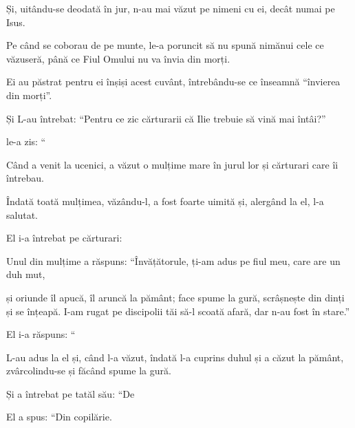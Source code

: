 {\par }{\PP {}Și, uitându-se deodată în jur, n-au mai văzut pe nimeni cu ei, decât numai pe Isus.


\par }{\PP {}Pe când se coborau de pe munte, le-a poruncit să nu spună nimănui cele ce văzuseră, până ce Fiul Omului nu va învia din morți.

Ei au păstrat pentru ei înșiși acest cuvânt, întrebându-se ce înseamnă “învierea din morți”.


\par }{\PP {}Și L-au întrebat: “Pentru ce zic cărturarii că Ilie trebuie să vină mai întâi?”


\par }{\PP {}le-a zis: “{}



\par }{\PP {}Când a venit la ucenici, a văzut o mulțime mare în jurul lor și cărturari care îi întrebau.

Îndată toată mulțimea, văzându-l, a fost foarte uimită și, alergând la el, l-a salutat.

El i-a întrebat pe cărturari:
{}


\par }{\PP {}Unul din mulțime a răspuns: “Învățătorule, ți-am adus pe fiul meu, care are un duh mut,

și oriunde îl apucă, îl aruncă la pământ; face spume la gură, scrâșnește din dinți și se înțeapă. I-am rugat pe discipolii tăi să-l scoată afară, dar n-au fost în stare.”


\par }{\PP {}El i-a răspuns: “{}


\par }{\PP {}L-au adus la el și, când l-a văzut, îndată l-a cuprins duhul și a căzut la pământ, zvârcolindu-se și făcând spume la gură.


\par }{\PP {}Și a întrebat pe tatăl său: “De
{}

\par }{\PP El a spus: “Din copilărie.

}
